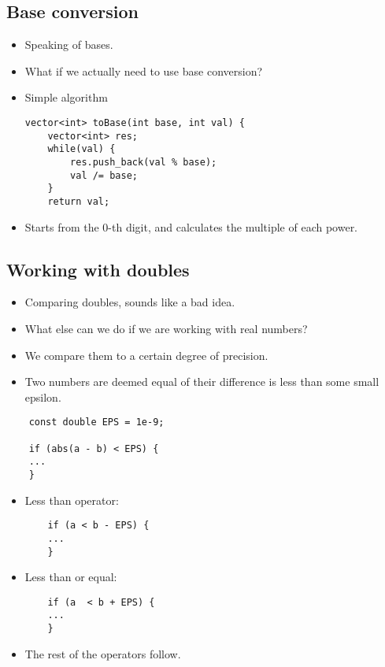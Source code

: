 \documentclass[12pt,t]{beamer}
\newcommand{\bi}{\begin{itemize}}
\newcommand{\ei}{\end{itemize}}
\begin{document}
\subsection{Base conversion}
\begin{frame}[fragile]
  \vspace{20pt}
  \bi
    \item Speaking of bases.
    \item What if we actually need to use base conversion?
    \item Simple algorithm
      \begin{verbatim}
vector<int> toBase(int base, int val) {
    vector<int> res;
    while(val) {
        res.push_back(val % base);
        val /= base;
    }
    return val;
      \end{verbatim}
    \item Starts from the $0$-th digit, and calculates the multiple of each power.
  \ei
\end{frame}

\subsection{Working with doubles}

\begin{frame}[fragile]
  \vspace{30pt}
  \bi
    \item Comparing doubles, sounds like a bad idea.
    \item What else can we do if we are working with real numbers?
    \item We compare them to a certain degree of precision.
    \item Two numbers are deemed equal of their difference is less than some small epsilon.
  \ei

    \begin{verbatim}
    const double EPS = 1e-9;

    if (abs(a - b) < EPS) {
    ...
    }
    \end{verbatim}
\end{frame}

\begin{frame}[fragile]
  \vspace{40pt}
  \bi
    \item Less than operator:
      \begin{verbatim}
    if (a < b - EPS) {
    ...
    }
      \end{verbatim}
    \item Less than or equal:
      \begin{verbatim}
    if (a  < b + EPS) {
    ...
    }
    \end{verbatim}
    \item The rest of the operators follow.
  \ei
\end{frame}
\end{document}
